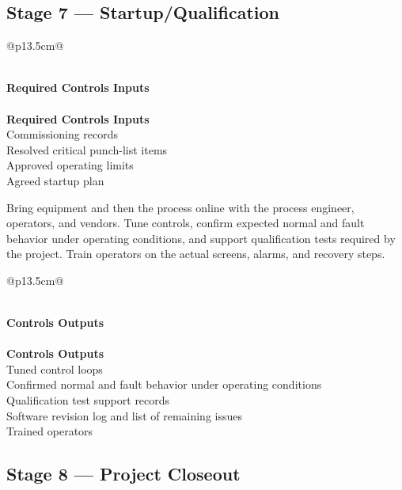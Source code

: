 \subsection{Stage 7 --- Startup/Qualification}

\begin{longtable}{@{}p{13.5cm}@{}}
\caption{Stage 7 --- Required Controls Inputs}\label{tab:stage7-inputs} \\
\toprule
{}\textbf{Required Controls Inputs} \\
\midrule
\endfirsthead
{} \\
\toprule
{}\textbf{Required Controls Inputs} \\
\midrule
\endhead
Commissioning records \\
Resolved critical punch-list items \\
Approved operating limits \\
Agreed startup plan \\
\bottomrule
\end{longtable}

Bring equipment and then the process online with the process engineer, operators, and vendors. Tune controls, confirm expected normal and fault behavior under operating conditions, and support qualification tests required by the project. Train operators on the actual screens, alarms, and recovery steps.

\begin{longtable}{@{}p{13.5cm}@{}}
\caption{Stage 7 --- Controls Outputs}\label{tab:stage7-outputs} \\
\toprule
{}\textbf{Controls Outputs} \\
\midrule
\endfirsthead
{} \\
\toprule
{}\textbf{Controls Outputs} \\
\midrule
\endhead
Tuned control loops \\
Confirmed normal and fault behavior under operating conditions \\
Qualification test support records \\
Software revision log and list of remaining issues \\
Trained operators \\
\bottomrule
\end{longtable}

\subsection{Stage 8 --- Project Closeout}

